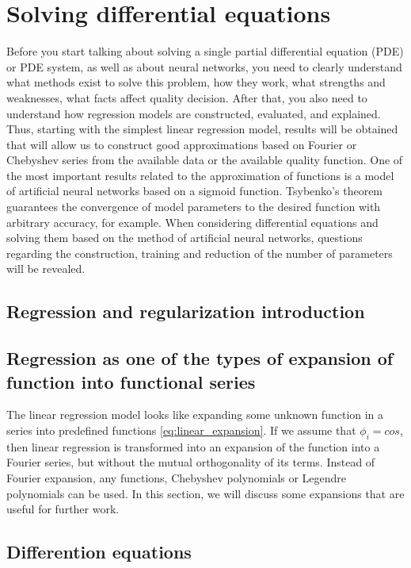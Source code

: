\chapter{Solving differential equations}

Before you start talking about solving a single partial differential equation (PDE) or PDE system, as well as about neural networks, you need to clearly understand what methods exist to solve this problem, how they work, what strengths and weaknesses, what facts affect quality decision. After that, you also need to understand how regression models are constructed, evaluated, and explained. Thus, starting with the simplest linear regression model, results will be obtained that will allow us to construct good approximations based on Fourier or Chebyshev series from the available data or the available quality function. One of the most important results related to the approximation of functions is a model of artificial neural networks based on a sigmoid function. Tsybenko’s theorem guarantees the convergence of model parameters to the desired function with arbitrary accuracy, for example. When considering differential equations and solving them based on the method of artificial neural networks, questions regarding the construction, training and reduction of the number of parameters will be revealed.

\section{Regression and regularization introduction}


\section{Regression as one of the types of expansion of function into functional series}
The linear regression model looks like expanding some unknown function in a series into predefined functions \eqref{eq:linear_expansion}. If we assume that $ \phi_i = cos $, then linear regression is transformed into an expansion of the function into a Fourier series, but without the mutual orthogonality of its terms. Instead of Fourier expansion, any functions, Chebyshev polynomials or Legendre polynomials can be used. In this section, we will discuss some expansions that are useful for further work.





\section{Differention equations}


